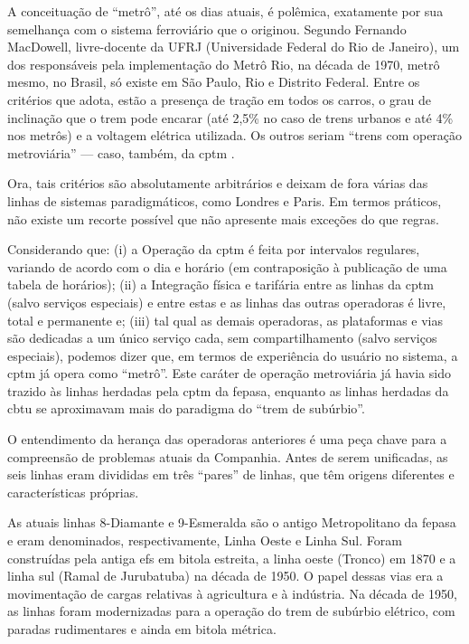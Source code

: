 \documentclass[11pt,fleqn]{book} %
\begin{document}

A conceituação de \enquote{metrô}, até os dias atuais, é polêmica, exatamente por sua semelhança com o sistema ferroviário que o originou. Segundo Fernando MacDowell, livre-docente da UFRJ (Universidade Federal do Rio de Janeiro), um dos responsáveis pela implementação do Metrô Rio, na década de 1970, metrô mesmo, no Brasil, só existe em São Paulo, Rio e Distrito Federal. Entre os critérios que adota, estão a presença de tração em todos os carros, o grau de inclinação que o trem pode encarar (até 2,5\% no caso de trens urbanos e até 4\% nos metrôs) e a voltagem elétrica utilizada. Os outros seriam \enquote{trens com operação metroviária} --- caso, também, da \gls{cptm} \cite{sereza2009a}.

Ora, tais critérios são absolutamente arbitrários e deixam de fora várias das linhas de sistemas paradigmáticos, como Londres e Paris. Em termos práticos, não existe um recorte possível que não apresente mais exceções do que regras.

Considerando que: (i) a Operação da \gls{cptm} é feita por intervalos regulares, variando de acordo com o dia e horário (em contraposição à publicação de uma tabela de horários); (ii) a Integração física e tarifária entre as linhas da \gls{cptm} (salvo serviços especiais) e entre estas e as linhas das outras operadoras é livre, total e permanente e; (iii) tal qual as demais operadoras, as plataformas e vias são dedicadas a um único serviço cada, sem compartilhamento (salvo serviços especiais), podemos dizer que, em termos de experiência do usuário no sistema, a \gls{cptm} já opera como \enquote{metrô}. Este caráter de operação metroviária já havia sido trazido às linhas herdadas pela \gls{cptm} da \gls{fepasa}, enquanto as linhas herdadas da \gls{cbtu} se aproximavam mais do paradigma do \enquote{trem de subúrbio}.


O entendimento da herança das operadoras anteriores é uma peça chave para a compreensão de problemas atuais da Companhia. Antes de serem unificadas, as seis linhas eram divididas em três \enquote{pares} de linhas, que têm origens diferentes e características próprias. 

As atuais linhas 8-Diamante e 9-Esmeralda são o antigo Metropolitano da \gls{fepasa} e eram denominados, respectivamente, Linha Oeste e Linha Sul. Foram construídas pela antiga \glsdesc{efs} em bitola estreita, a linha oeste (Tronco) em 1870 e a linha sul (Ramal de Jurubatuba) na década de 1950. O papel dessas vias era a movimentação de cargas relativas à agricultura e à indústria. Na década de 1950, as linhas foram modernizadas para a operação do trem de subúrbio elétrico, com paradas rudimentares e ainda em bitola métrica.
\end{document}
